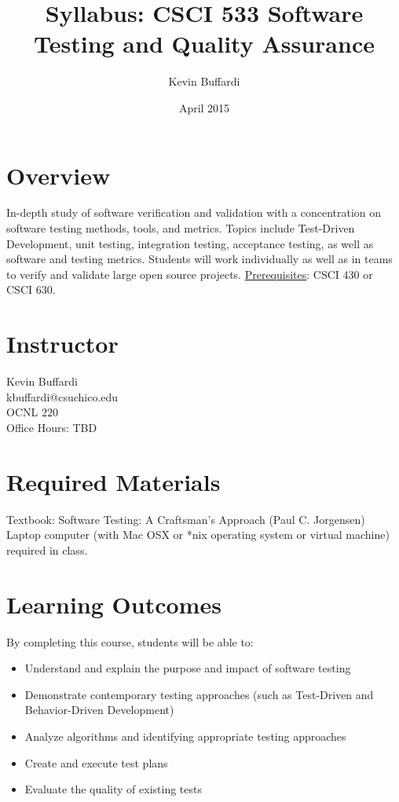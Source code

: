 \documentclass[12pt]{article}
\title{Syllabus: CSCI 533 Software Testing and Quality Assurance}
\author{Kevin Buffardi}
\date{April 2015}
\begin{document}
  \maketitle
  \section*{Overview}	 
  \noindent
  In-depth study of software verification and validation with a concentration on software testing methods, tools, and metrics. Topics include Test-Driven Development, unit testing, integration testing, acceptance testing, as well as software and testing metrics. Students will work individually as well as in teams to verify and validate large open source projects.
  \newline
  \newline
  \underline{Prerequisites}: CSCI 430 or CSCI 630. \\
  
  \section*{Instructor}
  \noindent
  Kevin Buffardi \\
  kbuffardi@csuchico.edu \\
  OCNL 220 \\
  Office Hours: TBD\\

  \section*{Required Materials}
  \noindent
  Textbook: Software Testing: A Craftsman's Approach (Paul C. Jorgensen)
  \newline
  Laptop computer (with Mac OSX or *nix operating system or virtual machine) required in class.

  \section*{Learning Outcomes}
  \noindent
  By completing this course, students will be able to:
  \begin{itemize}
    \item Understand and explain the purpose and impact of software testing
    \item Demonstrate contemporary testing approaches (such as Test-Driven and Behavior-Driven Development)
    \item Analyze algorithms and identifying appropriate testing approaches
    \item Create and execute test plans
    \item Evaluate the quality of existing tests
  \end{itemize}
\end{document}
